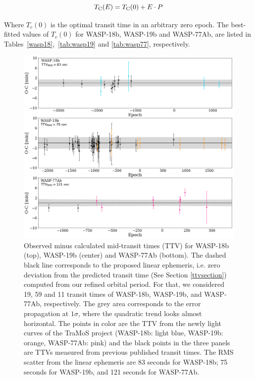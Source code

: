 \begin{equation} \label{eq1}
T_{\rm C}(E)=T_{\rm C}(0)+E \cdot P
\end{equation}

Where $T_{c}(0)$ is the optimal transit time in an arbitrary zero epoch. The best-fitted values of $T_{c}(0)$ for WASP-18b, WASP-19b and WASP-77Ab, are listed in Tables~\ref{wasp18},~\ref{tab:wasp19} and \ref{tab:wasp77}, respectively.

\begin{figure}
\centering
\includegraphics[width=1.0\columnwidth]{imagenes/TTVs.png}
\caption{Observed minus calculated mid-transit times (TTV) for WASP-18b (top), WASP-19b (center) and WASP-77Ab (bottom). The dashed black line corresponds to the proposed linear ephemeris, i.e. zero deviation from the predicted transit time (See Section \ref{ttvsection}) computed from our refined orbital period. For that, we considered 19, 59 and 11 transit times of WASP-18b, WASP-19b, and WASP-77Ab, respectively. The grey area corresponds to the error propagation at $1\sigma$, where the quadratic trend looks almost horizontal. The points in color are the TTV from the newly light curves of the TraMoS project (WASP-18b: light blue, WASP-19b: orange, WASP-77Ab: pink) and the black points in the three panels are TTVs measured from previous published transit times. The RMS scatter from the linear ephemeris are 83 seconds for WASP-18b; 75 seconds for WASP-19b, and 121 seconds for WASP-77Ab.}
\label{all_ttv}
\end{figure}


